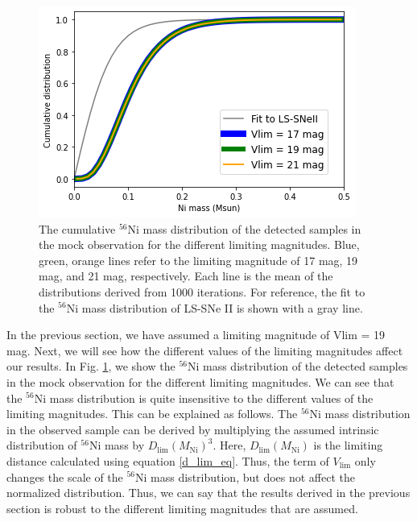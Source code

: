 \documentclass[twocolumn, linenumbers]{aastex62}
\begin{document}
\begin{figure}[htbp]
	\includegraphics[width=\columnwidth]{Ni_cum_dist_different_Vlim.png}
    \caption{The cumulative $^{56}$Ni mass distribution of the detected samples in the mock observation for the different limiting magnitudes. Blue, green, orange lines refer to the limiting magnitude of 17 mag, 19 mag, and 21 mag, respectively. Each line is the mean of the distributions derived from 1000 iterations. For reference, the fit to the $^{56}$Ni mass distribution  of LS-SNe II is shown with a gray line.} 
     \label{Ni_dist_mock_different_Vlim}
\end{figure}

In the previous section, we have assumed a limiting magnitude of Vlim = 19 mag. Next, we will see how the different values of the limiting magnitudes affect our results.
In Fig. \ref{Ni_dist_mock_different_Vlim}, we show the $^{56}$Ni mass distribution of the detected samples in the mock observation for the different limiting magnitudes. We can see that the $^{56}$Ni mass distribution is quite insensitive to the different values of the limiting magnitudes. This can be explained as follows. The $^{56}$Ni mass distribution in the observed sample can be derived by multiplying the assumed intrinsic distribution of $^{56}$Ni mass by $D_{\mathrm{lim}} (M_{\mathrm{Ni}})^3$. Here,
$D_{\mathrm{lim}} (M_{\mathrm{Ni}})$  is the limiting distance calculated using equation \ref{d_lim_eq}. Thus, the term of $V_{\mathrm{lim}}$ only changes the scale of the $^{56}$Ni mass distribution, but does not affect the normalized distribution. 
Thus, we can say that the results derived in the previous section is robust to the different limiting magnitudes that are assumed. 
\end{document}
